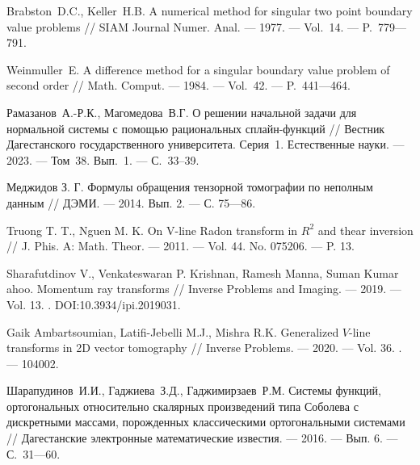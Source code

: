 \begin{thebibliography}{11}
Brabston~D.C., Keller~H.B. A numerical method for singular
 two point  boundary value problems
 // SIAM Journal Numer. Anal. --- 1977. --- Vol.~14. --- P.~779---791.





Weinmuller~E. A difference  method for a singular
 boundary value problem of second order
 // Math. Comput. --- 1984. --- Vol.~42. --- P.~441---464. 
 




Рамазанов~А.-Р.К., Магомедова~В.Г. О решении начальной задачи для 
нормальной системы с помощью рациональных сплайн-функций // Вестник Дагестанского 
государственного университета. Серия~1. Естественные науки. --- 2023. --- Том~38. Вып.~1. 
--- С.~33--39. 






Меджидов З. Г. Формулы обращения тензорной томографии по неполным данным // ДЭМИ. --- 2014. Вып. 2. --- С. 75---86.





Truong T. T., Nguen M. K. On V-line Radon transform in $R^2$   and thear inversion // J. Phis. A: Math. Theor. --- 2011. --- Vol. 44. No. 075206. --- P. 13.





Sharafutdinov V., Venkateswaran P. Krishnan, Ramesh Manna, Suman Kumar ahoo. Momentum ray transforms // Inverse Problems and Imaging. --- 2019. --- Vol. 13. . DOI:10.3934/ipi.2019031.





Gaik Ambartsoumian, Latifi-Jebelli M.J., Mishra R.K.
Generalized $V$-line transforms in 2D vector tomography
//
Inverse Problems.
--- 2020.
--- Vol. 36. .
--- 104002.
  




{Шарапудинов~И.И., Гаджиева~З.Д., Гаджимирзаев~Р.М.} 
Системы функций, ортогональных относительно скалярных произведений типа Соболева с дискретными массами, порожденных классическими ортогональными системами 
// 
Дагестанские электронные математические известия. 
--- 2016. 
--- Вып. 6.
--- С.~31---60.






\end{thebibliography}
